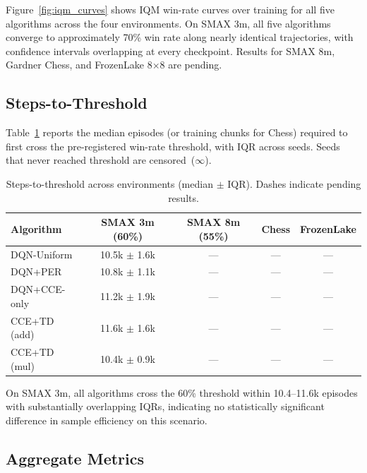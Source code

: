 \documentclass[conference]{IEEEtran}
\begin{document}
Figure~\ref{fig:iqm_curves} shows IQM win-rate curves over training for all five algorithms across the four environments.
On SMAX 3m, all five algorithms converge to approximately 70\% win rate along nearly identical trajectories, with confidence intervals overlapping at every checkpoint.
Results for SMAX 8m, Gardner Chess, and FrozenLake 8$\times$8 are pending.

\subsection{Steps-to-Threshold}

Table~\ref{tab:stt} reports the median episodes (or training chunks for Chess) required to first cross the pre-registered win-rate threshold, with IQR across seeds.
Seeds that never reached threshold are censored~($\infty$).

\begin{table}[h]
\centering
\caption{Steps-to-threshold across environments (median $\pm$ IQR). Dashes indicate pending results.}
\label{tab:stt}
\begin{tabular}{lcccc}
\hline
Algorithm & SMAX 3m (60\%) & SMAX 8m (55\%) & Chess & FrozenLake \\
\hline
DQN-Uniform  & 10.5k $\pm$ 1.6k & --- & --- & --- \\
DQN+PER      & 10.8k $\pm$ 1.1k & --- & --- & --- \\
DQN+CCE-only & 11.2k $\pm$ 1.9k & --- & --- & --- \\
CCE+TD (add) & 11.6k $\pm$ 1.6k & --- & --- & --- \\
CCE+TD (mul) & 10.4k $\pm$ 0.9k & --- & --- & --- \\
\hline
\end{tabular}
\end{table}

On SMAX 3m, all algorithms cross the 60\% threshold within 10.4--11.6k episodes with substantially overlapping IQRs, indicating no statistically significant difference in sample efficiency on this scenario.

\subsection{Aggregate Metrics}
\end{document}
